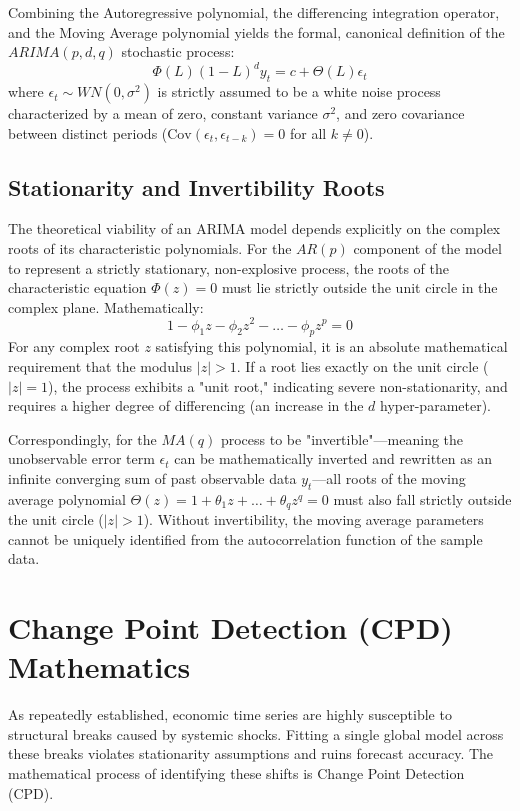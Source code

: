 Combining the Autoregressive polynomial, the differencing integration operator, and the Moving Average polynomial yields the formal, canonical definition of the $ARIMA(p, d, q)$ stochastic process:
\begin{equation}
    \Phi(L) (1-L)^d y_t = c + \Theta(L) \epsilon_t
\end{equation}
where $\epsilon_t \sim WN(0, \sigma^2)$ is strictly assumed to be a white noise process characterized by a mean of zero, constant variance $\sigma^2$, and zero covariance between distinct periods ($\text{Cov}(\epsilon_t, \epsilon_{t-k}) = 0$ for all $k \neq 0$).

\subsection{Stationarity and Invertibility Roots}
The theoretical viability of an ARIMA model depends explicitly on the complex roots of its characteristic polynomials. For the $AR(p)$ component of the model to represent a strictly stationary, non-explosive process, the roots of the characteristic equation $\Phi(z) = 0$ must lie strictly outside the unit circle in the complex plane. Mathematically:
\begin{equation}
    1 - \phi_1 z - \phi_2 z^2 - \dots - \phi_p z^p = 0
\end{equation}
For any complex root $z$ satisfying this polynomial, it is an absolute mathematical requirement that the modulus $|z| > 1$. If a root lies exactly on the unit circle ($|z| = 1$), the process exhibits a "unit root," indicating severe non-stationarity, and requires a higher degree of differencing (an increase in the $d$ hyper-parameter).

Correspondingly, for the $MA(q)$ process to be "invertible"—meaning the unobservable error term $\epsilon_t$ can be mathematically inverted and rewritten as an infinite converging sum of past observable data $y_t$—all roots of the moving average polynomial $\Theta(z) = 1 + \theta_1 z + \dots + \theta_q z^q = 0$ must also fall strictly outside the unit circle ($|z| > 1$). Without invertibility, the moving average parameters cannot be uniquely identified from the autocorrelation function of the sample data.


\section{Change Point Detection (CPD) Mathematics}
As repeatedly established, economic time series are highly susceptible to structural breaks caused by systemic shocks. Fitting a single global model across these breaks violates stationarity assumptions and ruins forecast accuracy. The mathematical process of identifying these shifts is Change Point Detection (CPD).

